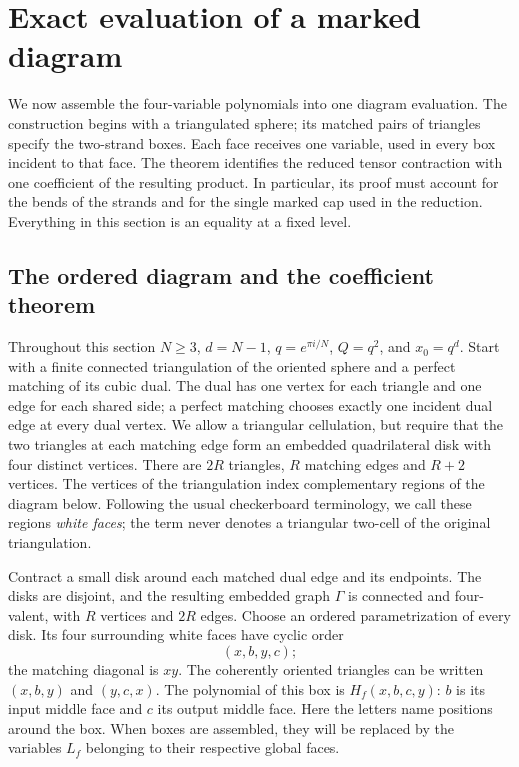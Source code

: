 \section{Exact evaluation of a marked diagram}
\label{de:section}

We now assemble the four-variable polynomials into one diagram
evaluation. The construction begins with a triangulated sphere; its
matched pairs of triangles specify the two-strand boxes. Each face
receives one variable, used in every box incident to that face. The
theorem identifies the reduced tensor contraction with one coefficient
of the resulting product. In particular, its proof must account for
the bends of the strands and for the single marked cap used in the
reduction. Everything in this section is an equality at a fixed level.

\subsection{The ordered diagram and the coefficient theorem}

Throughout this section \(N\ge3\), \(d=N-1\),
\(q=e^{\pi i/N}\), \(Q=q^2\), and \(x_0=q^d\).
Start with a finite connected triangulation of the oriented sphere and
a perfect matching of its cubic dual. The dual has one vertex for
each triangle and one edge for each shared side; a perfect matching
chooses exactly one incident dual edge at every dual vertex. We allow a triangular
cellulation, but require that the two triangles at each matching edge
form an embedded quadrilateral disk with four distinct vertices.
There are \(2R\) triangles, \(R\) matching edges and \(R+2\) vertices.
The vertices of the triangulation index complementary regions of the
diagram below. Following the usual checkerboard terminology, we call
these regions \emph{white faces}; the term never denotes a triangular
two-cell of the original triangulation.

Contract a small disk around each matched dual edge and its endpoints.
The disks are disjoint, and the resulting embedded graph \(\Gamma\)
is connected and four-valent, with \(R\) vertices and \(2R\) edges.
Choose an ordered parametrization of every disk. Its four surrounding
white faces have cyclic order
\[
                         (x,b,y,c);
\]
the matching diagonal is \(xy\). The coherently oriented triangles
can be written \((x,b,y)\) and \((y,c,x)\). The polynomial of this box
is \(H_f(x,b,c,y)\): \(b\) is its input middle face and \(c\) its
output middle face. Here the letters name positions around the box.
When boxes are assembled, they will be replaced by the variables
$L_f$ belonging to their respective global faces.

